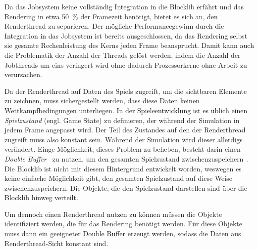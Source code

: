 Da das Jobsystem keine vollständig Integration in die Blocklib erfährt und das Rendering in etwa \SI{50}{\percent} der Framezeit benötigt, bietet es sich an, den Renderthread zu separieren. Der mögliche Performancegewinn durch die Integration in das Jobsystem ist bereits ausgeschlossen, da das Rendering selbst sie gesamte Rechenleistung des Kerns jeden Frame beansprucht. Damit kann auch die Problematik der Anzahl der Threads gelöst werden, indem die Anzahl der Jobthreads um eins veringert wird ohne dadurch Prozessorkerne ohne Arbeit zu verursachen.

Da der Renderthread auf Daten des Spiels zugreift, um die sichtbaren Elemente zu zeichnen, muss sichergestellt werden, dass diese Daten keinen Wettkampfbedingungen unterliegen. In der Spieleentwicklung ist es üblich einen \emph{Spielzustand} (engl. Game State) zu definieren, der während der Simulation in jedem Frame angepasst wird. Der Teil des Zustandes auf den der Renderthread zugreift muss also konstant sein. Während der Simulation wird dieser allerdigs verändert. Einge Möglichkeit, dieses Problem zu beheben, besteht darin einen \emph{Double Buffer}~\cite[S.~143]{Nystrom2015} zu nutzen, um den gesamten Spielzustand zwischenzuspeichern~\cite{Tatarchuk2014}. Die Blocklib ist nicht mit diesem Hintergrund entwickelt worden, weswegen es keine einfache Möglichkeit gibt, den gesamten Spielzustand auf diese Weise zwischenzuspeichern. Die Objekte, die den Spielzustand darstellen sind über die Blocklib hinweg verteilt. 

Um dennoch einen Renderthread nutzen zu können müssen die Objekte identifiziert werden, die für das Rendering benötigt werden. Für diese Objekte muss dann ein geeigneter Double Buffer erzeugt werden, sodass die Daten aus Renderthread-Sicht konstant sind.